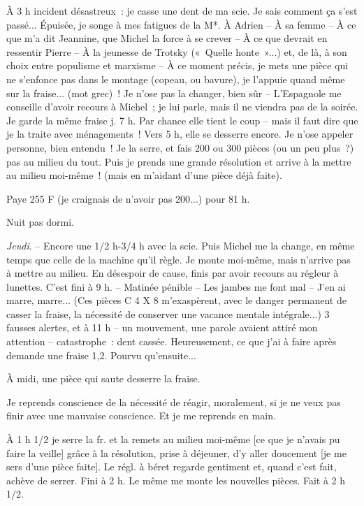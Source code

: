 \documentclass[french,twoside]{book} %
\begin{document}
À 3 h incident désastreux : je casse une dent de ma scie. Je sais comment ça s'est passé... Épuisée, je songe à mes fatigues de la M*. À Adrien – À sa femme – À ce que m'a dit Jeannine, que Michel la force à se crever – À ce que devrait en ressentir Pierre – À la jeunesse de Trotsky (« Quelle honte »...) et, de là, à son choix entre populisme et marxisme – À ce moment précis, je mets une pièce qui ne s'enfonce pas dans le montage (copeau, ou bavure), je l'appuie quand même sur la fraise... (mot grec) ! Je n'ose pas la changer, bien sûr – L'Espagnole me conseille d'avoir recours à Michel ; je lui parle, mais il ne viendra pas de la soirée. Je garde la même fraise j. 7 h. Par chance elle tient le coup – mais il faut dire que je la traite avec ménagements ! Vers 5 h, elle se desserre encore. Je n'ose appeler personne, bien entendu ! Je la serre, et fais 200 ou 300 pièces (ou un peu plus ?) pas au milieu du tout. Puis je prends une grande résolution et arrive à la mettre au milieu moi-même ! (mais en m'aidant d'une pièce déjà faite).\par
Paye 255 F (je craignais de n'avoir pas 200...) pour 81 h.\par
Nuit pas dormi.\par
{\itshape Jeudi}. – Encore une 1/2 h-3/4 h avec la scie. Puis Michel me la change, en même temps que celle de la machine qu'il règle. Je monte moi-même, mais n'arrive pas à mettre au milieu. En désespoir de cause, finis par avoir recours au régleur à lunettes. C'est fini à 9 h. – Matinée pénible – Les jambes me font mal – J'en ai marre, marre... (Ces pièces C 4 X 8 m'exaspèrent, avec le danger permanent de casser la fraise, la nécessité de conserver une vacance mentale intégrale...) 3 fausses alertes, et à 11 h – un mouvement, une parole avaient attiré mon attention – catastrophe : dent cassée. Heureusement, ce que j'ai à faire après demande une fraise 1,2. Pourvu qu'ensuite...\par
À midi, une pièce qui saute desserre la fraise.\par
Je reprends conscience de la nécessité de réagir, moralement, si je ne veux pas finir avec une mauvaise conscience. Et je me reprends en main.\par
À 1 h 1/2 je serre la fr. et la remets au milieu moi-même [ce que je n'avais pu faire la veille] grâce à la résolution, prise à déjeuner, d'y aller doucement [je me sers d'une pièce faite]. Le régl. à béret regarde gentiment et, quand c'est fait, achève de serrer. Fini à 2 h. Le même me monte les nouvelles pièces. Fait à 2 h 1/2.\par
\end{document}
